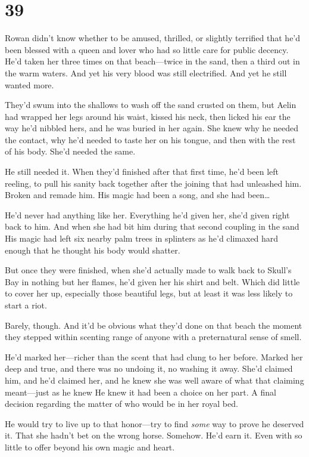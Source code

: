 
\chapter{39}

Rowan didn't know whether to be amused, thrilled, or slightly terrified that he'd been blessed with a queen and lover who had so little care for public decency. He'd taken her three times on that beach---twice in the sand, then a third out in the warm waters. And yet his very blood was still electrified. And yet he still wanted more.

They'd swum into the shallows to wash off the sand crusted on them, but Aelin had wrapped her legs around his waist, kissed his neck, then licked his ear the way he'd nibbled hers, and he was buried in her again. She knew why he needed the contact, why he'd needed to taste her on his tongue, and then with the rest of his body. She'd needed the same.

He still needed it. When they'd finished after that first time, he'd been left reeling, to pull his sanity back together after the joining that had  unleashed him. Broken and remade him. His magic had been a song, and she had been\ldots{}

He'd never had anything like her. Everything he'd given her, she'd given right back to him. And when she had bit him during that second coupling in the sand  His magic had left six nearby palm trees in splinters as he'd climaxed hard enough that he thought his body would shatter.

But once they were finished, when she'd actually made to walk back to Skull's Bay in nothing but her flames, he'd given her his shirt and belt. Which did little to cover her up, especially those beautiful legs, but at least it was less likely to start a riot.

Barely, though. And it'd be obvious what they'd done on that beach the moment they stepped within scenting range of anyone with a preternatural sense of smell.

He'd marked her---richer than the scent that had clung to her before. Marked her deep and true, and there was no undoing it, no washing it away. She'd claimed him, and he'd claimed her, and he knew she was well aware of what that claiming meant---just as he knew  He knew it had been a choice on her part. A final decision regarding the matter of who would be in her royal bed.

He would try to live up to that honor---try to find \emph{some} way to prove he deserved it. That she hadn't bet on the wrong horse. Somehow. He'd earn it. Even with so little to offer beyond his own magic and heart.

